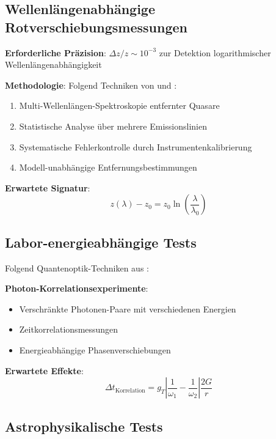\documentclass[12pt,a4paper]{article}
\begin{document}
	\subsection{Wellenlängenabhängige Rotverschiebungsmessungen}
	\label{app:redshift_measurements}
	
	\textbf{Erforderliche Präzision}: $\Delta z/z \sim 10^{-3}$ zur Detektion logarithmischer Wellenlängenabhängigkeit
	
	\textbf{Methodologie}: Folgend Techniken von \citet{murphy2003} und \citet{uzan2003}:
	\begin{enumerate}
		\item Multi-Wellenlängen-Spektroskopie entfernter Quasare
		\item Statistische Analyse über mehrere Emissionslinien
		\item Systematische Fehlerkontrolle durch Instrumentenkalibrierung
		\item Modell-unabhängige Entfernungsbestimmungen
	\end{enumerate}
	
	\textbf{Erwartete Signatur}: 
	\begin{equation}
		z(\lambda) - z_0 = z_0 \ln\left(\frac{\lambda}{\lambda_0}\right)
	\end{equation}
	
	\subsection{Labor-energieabhängige Tests}
	\label{app:laboratory_tests}
	
	Folgend Quantenoptik-Techniken aus \citet{scully1997}:
	
	\textbf{Photon-Korrelationsexperimente}:
	\begin{itemize}
		\item Verschränkte Photonen-Paare mit verschiedenen Energien
		\item Zeitkorrelationsmessungen
		\item Energieabhängige Phasenverschiebungen
	\end{itemize}
	
	\textbf{Erwartete Effekte}:
	\begin{equation}
		\Delta t_{\text{Korrelation}} = g_T \left|\frac{1}{\omega_1} - \frac{1}{\omega_2}\right| \frac{2G}{r}
	\end{equation}
	
	\subsection{Astrophysikalische Tests}
	\label{app:astrophysical_tests}
	
\end{document}
